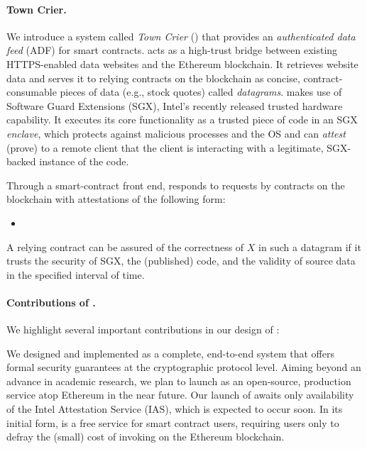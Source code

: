 \paragraph{\bf Town Crier.} We introduce a system called \emph{Town Crier} (\tc) that provides an \emph{authenticated data feed} (ADF) for smart contracts. \tc acts as a high-trust bridge between existing HTTPS-enabled data websites and the Ethereum blockchain. It retrieves website data and serves it to relying contracts on the blockchain as concise, contract-consumable pieces of data (e.g., stock quotes) called \emph{datagrams}. \tc makes use of Software Guard Extensions (SGX),  Intel's recently released trusted hardware capability. It executes its core functionality as a trusted piece of code in an SGX \emph{enclave}, which protects against malicious processes and the OS and can \emph{attest} (prove) to a remote client that the client is interacting with a legitimate, SGX-backed instance of the \tc code. 

Through a smart-contract front end, \tcs responds to requests by contracts on the blockchain with attestations of the following form:

\begin{itemize}[leftmargin=3mm]
\item[]
\end{itemize}

A relying contract can be assured of the correctness of $X$ in such a datagram if it trusts the security of SGX, the (published) \tc code, and the validity of source data in the specified interval of time.

\paragraph{Contributions of \tc.}
We highlight several important contributions in our design of \tc:

\vspace{1ex}
We designed and implemented \tcs as a complete, end-to-end system that offers formal security guarantees
at the cryptographic protocol level. Aiming beyond an advance in academic research, we plan to launch \tcs
as an open-source, production service atop Ethereum in the near future. Our launch of \tc awaits only availability of the Intel Attestation Service (IAS), which is expected to occur soon. In its initial form, \tcs is a free service for smart contract users, requiring users only to defray the (small) cost of invoking \tc on the Ethereum blockchain. 

